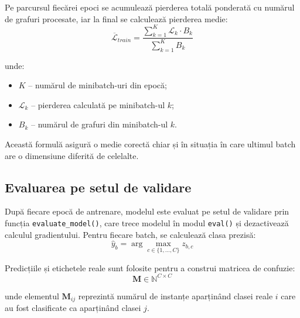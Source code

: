 \documentclass[12pt,a4paper]{report}
\theoremstyle{definition}
\theoremstyle{remark}
\begin{document}
Pe parcursul fiecărei epoci se acumulează pierderea totală ponderată cu numărul de grafuri procesate, iar la final se calculează pierderea medie:
\begin{equation}
    \overline{\mathcal{L}}_{train} =
    \frac{\sum_{k=1}^{K} \mathcal{L}_k \cdot B_k}{\sum_{k=1}^{K} B_k}
    \label{eq:avg_train_loss}
\end{equation}

\noindent unde:
\begin{itemize}
    \item $K$ -- numărul de minibatch-uri din epocă;
    \item $\mathcal{L}_k$ -- pierderea calculată pe minibatch-ul $k$;
    \item $B_k$ -- numărul de grafuri din minibatch-ul $k$.
\end{itemize}

Această formulă asigură o medie corectă chiar și în situația în care ultimul batch are o dimensiune diferită de celelalte.

\subsection{Evaluarea pe setul de validare}

După fiecare epocă de antrenare, modelul este evaluat pe setul de validare prin funcția \texttt{evaluate\_model()}, care trece modelul în modul \texttt{eval()} și dezactivează calculul gradientului. Pentru fiecare batch, se calculează clasa prezisă:
\begin{equation}
    \hat{y}_b = \arg\max_{c \in \{1,\ldots,C\}} z_{b,c}
    \label{eq:val_prediction}
\end{equation}

Predicțiile și etichetele reale sunt folosite pentru a construi matricea de confuzie:
\begin{equation}
    \mathbf{M} \in \mathbb{N}^{C \times C}
    \label{eq:confusion_matrix}
\end{equation}

\noindent unde elementul $\mathbf{M}_{ij}$ reprezintă numărul de instanțe aparținând clasei reale $i$ care au fost clasificate ca aparținând clasei $j$.
\end{document}
